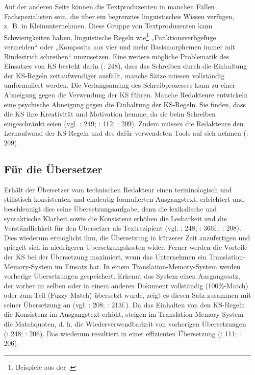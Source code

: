 Auf der anderen Seite können die Textproduzenten in manchen Fällen Fachspezialisten sein, die über ein begrenztes linguistisches Wissen verfügen, z.~B. in Kleinunternehmen. Diese Gruppe von Textproduzenten kann Schwierigkeiten haben, linguistische Regeln wie\footnote{{{{Beispiele aus der \citealt{tekom2013}.}}}} „Funktionsverbgefüge vermeiden“ oder „Komposita aus vier und mehr Basismorphemen immer mit Bindestrich schreiben“ umzusetzen. Eine weitere mögliche Problematik des Einsatzes von KS besteht darin (\citealt{NybergEtAl2003}: 248), dass das Schreiben durch die Einhaltung der KS-Regeln zeitaufwendiger ausfällt, manche Sätze müssen vollständig umformuliert werden. Die Verlangsamung des Schreibprozesses kann zu einer Abneigung gegen die Verwendung der KS führen. Manche Redakteure entwickeln eine psychische Abneigung gegen die Einhaltung der KS-Regeln. Sie finden, dass die KS ihre Kreativität und Motivation hemme, da sie beim Schreiben eingeschränkt seien (vgl. \citealt{NybergEtAl2003}: 249; \citealt{LehrndorferReuther2008}: 112; \citealt{DrewerZiegler2014}: 209). Zudem müssen die Redakteure den Lernaufwand der KS-Regeln und des dafür verwendeten Tools auf sich nehmen (\citealt{DrewerZiegler2014}: 209).

\subsection{Für die Übersetzer}


Erhält der Übersetzer vom technischen Redakteur einen terminologisch und stilistisch konsistenten und eindeutig formulierten Ausgangstext, erleichtert und beschleunigt dies seine Übersetzungsaufgabe, denn die lexikalische und syntaktische Klarheit sowie die Konsistenz erhöhen die Lesbarkeit und die Verständlichkeit für den Übersetzer als Textrezipient (vgl. \citealt{NybergEtAl2003}: 248; \citealt{Göpferich2008}: 366f.; \citealt{DrewerZiegler2014}: 208). Dies wiederum ermöglicht ihm, die Übersetzung in kürzerer Zeit anzufertigen und spiegelt sich in niedrigeren Übersetzungskosten wider. Ferner werden die Vorteile der KS bei der Übersetzung maximiert, wenn das Unternehmen ein Translation-Memory-System im Einsatz hat. In einem Translation-Memory-System werden vorherige Übersetzungen gespeichert. Erkennt das System einen Ausgangssatz, der vorher im selben oder in einem anderen Dokument vollständig (100\%-Match) oder zum Teil (Fuzzy-Match) übersetzt wurde, zeigt es diesen Satz zusammen mit seiner Übersetzung an (vgl. \citealt{DrewerZiegler2014}: 208; \citealt{DrewerSchmitz2017}: 213f.). Da das Einhalten von den KS-Regeln die Konsistenz im Ausgangstext erhöht, steigen im Translation-Memory-System die Matchquoten, d. h. die Wiederverwendbarkeit von vorherigen Übersetzungen (\citealt{NybergEtAl2003}: 248; \citealt{DrewerZiegler2014}: 206). Das wiederum resultiert in einer effizienten Übersetzung (\citealt{LehrndorferReuther2008}: 111; \citealt{DrewerZiegler2014}: 206).

